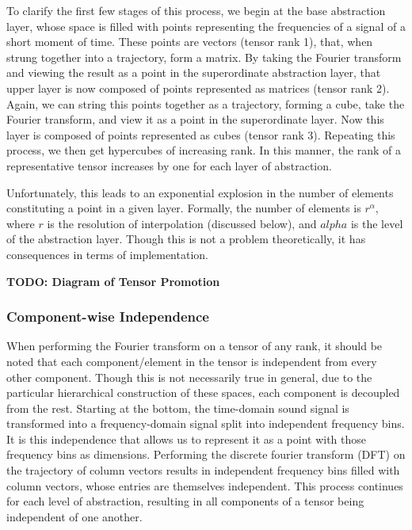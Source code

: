 \documentclass[runningheads]{llncs}
\begin{document}
To clarify the first few stages of this process, we begin at the base abstraction layer, whose space is filled with points representing the frequencies of a signal of a short moment of time.  These points are vectors (tensor rank 1), that, when strung together into a trajectory, form a matrix.  By taking the Fourier transform and viewing the result as a point in the superordinate abstraction layer, that upper layer is now composed of points represented as matrices (tensor rank 2).  Again, we can string this points together as a trajectory, forming a cube, take the Fourier transform, and view it as a point in the superordinate layer.  Now this layer is composed of points represented as cubes (tensor rank 3). Repeating this process, we then get hypercubes of increasing rank.  In this manner, the rank of a representative tensor increases by one for each layer of abstraction.

Unfortunately, this leads to an exponential explosion in the number of elements constituting a point in a given layer.  Formally, the number of elements is $r^\alpha$, where $r$ is the resolution of interpolation (discussed below), and $alpha$ is the level of the abstraction layer.  Though this is not a problem theoretically, it has consequences in terms of implementation.

\textbf{TODO: Diagram of Tensor Promotion}

\subsubsection{Component-wise Independence}

When performing the Fourier transform on a tensor of any rank, it should be noted that each component/element in the tensor is independent from every other component.  Though this is not necessarily true in general, due to the particular hierarchical construction of these spaces, each component is decoupled from the rest.  Starting at the bottom, the time-domain sound signal is transformed into a frequency-domain signal split into independent frequency bins.  It is this independence that allows us to represent it as a point with those frequency bins as dimensions.  Performing the discrete fourier transform (DFT) on the trajectory of column vectors results in independent frequency bins filled with column vectors, whose entries are themselves independent.  This process continues for each level of abstraction, resulting in all components of a tensor being independent of one another.
\end{document}
